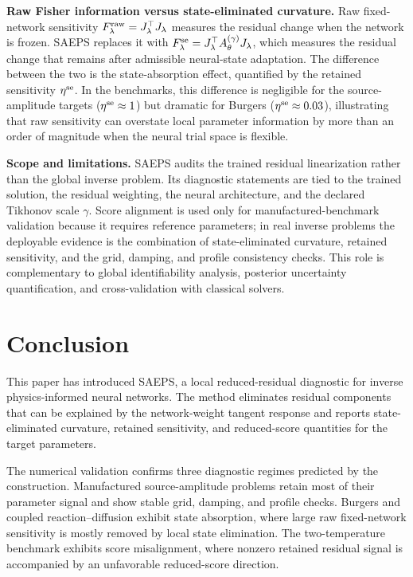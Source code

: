 \documentclass[preprint,12pt]{elsarticle}
\newcommand{\Fse}{F_{\lambda}^{\rm se}}
\newcommand{\Fraw}{F_{\lambda}^{\rm raw}}
\begin{document}
\medskip\noindent
\textbf{Raw Fisher information versus state-eliminated curvature.}
Raw fixed-network sensitivity $\Fraw = J_\lambda^\top J_\lambda$ measures the residual change when the network is frozen. SAEPS replaces it with $\Fse = J_\lambda^\top A_\theta^{(\gamma)} J_\lambda$, which measures the residual change that remains after admissible neural-state adaptation. The difference between the two is the state-absorption effect, quantified by the retained sensitivity $\eta^{\rm se}$. In the benchmarks, this difference is negligible for the source-amplitude targets ($\eta^{\rm se}\approx 1$) but dramatic for Burgers ($\eta^{\rm se}\approx 0.03$), illustrating that raw sensitivity can overstate local parameter information by more than an order of magnitude when the neural trial space is flexible.

\medskip\noindent
\textbf{Scope and limitations.}
SAEPS audits the trained residual linearization rather than the global inverse problem. Its diagnostic statements are tied to the trained solution, the residual weighting, the neural architecture, and the declared Tikhonov scale $\gamma$. Score alignment is used only for manufactured-benchmark validation because it requires reference parameters; in real inverse problems the deployable evidence is the combination of state-eliminated curvature, retained sensitivity, and the grid, damping, and profile consistency checks. This role is complementary to global identifiability analysis, posterior uncertainty quantification, and cross-validation with classical solvers.

\FloatBarrier

\section{Conclusion}

This paper has introduced SAEPS, a local reduced-residual diagnostic for inverse physics-informed neural networks. The method eliminates residual components that can be explained by the network-weight tangent response and reports state-eliminated curvature, retained sensitivity, and reduced-score quantities for the target parameters.

The numerical validation confirms three diagnostic regimes predicted by the construction. Manufactured source-amplitude problems retain most of their parameter signal and show stable grid, damping, and profile checks. Burgers and coupled reaction--diffusion exhibit state absorption, where large raw fixed-network sensitivity is mostly removed by local state elimination. The two-temperature benchmark exhibits score misalignment, where nonzero retained residual signal is accompanied by an unfavorable reduced-score direction.
\end{document}
